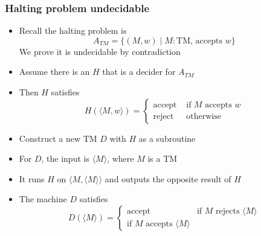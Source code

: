 




\begin{frame}[allowframebreaks] \frametitle{Halting problem undecidable}
  \begin{itemize}
\item Recall the halting problem is
  \begin{equation*}
A_{TM}
=\{(M,w)\mid M: \mbox{TM, accepts } w\}
\end{equation*}
We prove it is undecidable
by contradiction
\item Assume there is an $H$ that is a decider for $A_{TM}$
\item [] Then $H$ satisfies
  \begin{equation*}
    H(\langle  M,w\rangle )=
    \begin{cases}
      \mbox{accept} & \mbox{ if } M \mbox{ accepts } w\\
\mbox{reject} & \mbox{ otherwise}
    \end{cases}
  \end{equation*}
\item Construct a new TM $D$ with $H$ as a subroutine

\item For $D$, the input is $\langle  M\rangle $, where
  $M$ is a TM

\item [] It runs $H$ on $\langle  M,\langle  M\rangle \rangle $
and 
outputs the opposite result of $H$




\item The machine $D$ satisfies
  \begin{equation*}
    D(\langle  M\rangle )
=
\begin{cases}
  \mbox{accept } & 
  \mbox{if } M \mbox{ rejects } \langle  M\rangle \\
\mbox{if } M \mbox{ accepts } \langle  M\rangle
\end{cases}
  \end{equation*}


\end{itemize}
\end{frame}
